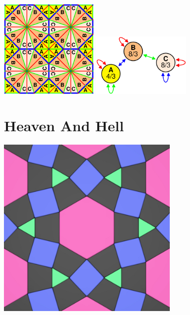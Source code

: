 \documentclass{beamer}
\begin{document}
\begin{frame}
  \begin{center}
    \includegraphics[width=1.9in]{dsymbol3}
    \includegraphics[width=1.9in]{dsymbol5}
  \end{center}
\end{frame}


\section{Heaven And Hell}

\begin{frame}
  \begin{center}
    \includegraphics[width=3.5in]{hh13}
  \end{center}
\end{frame}
\end{document}
